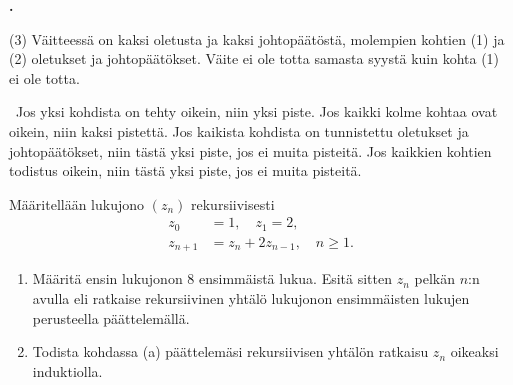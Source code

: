 \documentclass[11pt,a4paper,oneside,notitlepage,final]{article}
\newcommand{\N}{\mathbb{N}}
\newcounter{harjnro}
\newenvironment{harjlist}
  {\begin{list}{\kor{\arabic{harjnro}.}}
    {\usecounter{harjnro}
      \setlength{\labelwidth}{0em}
      \setlength{\labelsep}{0.4em}
      \setlength{\leftmargin}{0pt}
      \setlength{\parsep}{5pt}
      \setlength{\itemindent}{0.4em}
      \setlength{\topsep}{0.5\parskip}
      \setlength{\itemsep}{0.75\parskip}
    }
  }
  {\end{list}}
\newcommand{\kor}[1]{\textbf{#1}}
\begin{document}
\begin{harjlist}
(3) Väitteessä on kaksi oletusta ja kaksi johtopäätöstä, molempien kohtien (1) ja
(2) oletukset ja johtopäätökset. Väite ei ole totta samasta syystä kuin kohta (1) ei
ole totta.

\arvostelu \
Jos yksi kohdista on tehty oikein, niin yksi piste. Jos kaikki kolme kohtaa ovat oikein,
niin kaksi pistettä. Jos kaikista kohdista on tunnistettu oletukset ja johtopäätökset, 
niin tästä yksi piste, jos ei muita pisteitä. Jos kaikkien kohtien todistus oikein,
niin tästä yksi piste, jos ei muita pisteitä.

\item[6.] Määritellään lukujono $(z_n)$ rekursiivisesti
\begin{align*}
z_0&=1,\quad z_1=2,\\
z_{n+1}&=z_n+2z_{n-1},\quad n\geqslant 1.
\end{align*}
\begin{enumerate}
\item[(a)] Määritä ensin lukujonon 8 ensimmäistä lukua. Esitä sitten $z_n$ pelkän $n$:n avulla eli
ratkaise rekursiivinen yhtälö lukujonon ensimmäisten lukujen perusteella päättelemällä. 
\item[(b)] Todista kohdassa (a) päättelemäsi rekursiivisen yhtälön ratkaisu $z_n$ oikeaksi
induktiolla.
\end{enumerate}


\end{harjlist}
\end{document}

